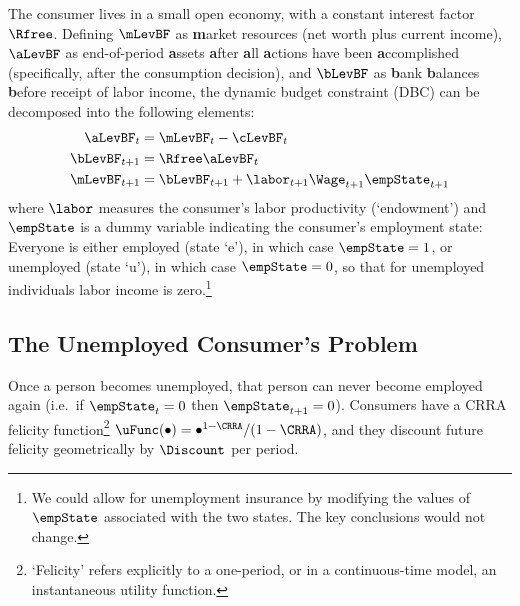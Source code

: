 \documentclass{handout}
\begin{document}
The consumer lives in a small open economy, with a constant interest factor $\Rfree$.  Defining $\mLevBF$ as
{\bf m}arket resources (net worth plus current income), $\aLevBF$ as
end-of-period {\bf a}ssets {\bf a}fter {\bf a}ll {\bf a}ctions have been {\bf a}ccomplished
(specifically, after the consumption decision), and $\bLevBF$ as {\bf b}ank
{\bf b}alances {\bf b}efore receipt of labor income, the dynamic budget constraint (DBC) can be decomposed into the
following elements:
\begin{equation}\begin{gathered}\begin{aligned}
    \aLevBF_{t} & =  \mLevBF_{t}-\cLevBF_{t}
\\  \bLevBF_{t+1} & =  \Rfree \aLevBF_{t}
\\  \mLevBF_{t+1} & =  \bLevBF_{t+1}+\labor_{t+1}\Wage_{t+1}\empState_{t+1}  \label{eq:DBC}
\end{aligned}\end{gathered}\end{equation}
where $\labor$ measures the consumer's labor productivity
(`endowment') and $\empState$ is a dummy variable indicating the
consumer's employment state: Everyone is either
employed (state `e'), in which case $\empState = 1$, or unemployed
(state `u'), in which case $\empState=0$, so that for unemployed
individuals labor income is zero.\footnote{We could allow for
  unemployment insurance by modifying the values of $\empState$
  associated with the two states.  The key conclusions would not
  change.}

\pagebreak 
\subsection{The Unemployed Consumer's Problem} \label{subsec:Fred}

Once a person becomes unemployed, that person can never become
employed again (i.e.\ if $\empState_{t}=0$ then $\empState_{t+1}=0$).
Consumers have a CRRA felicity function\footnote{`Felicity' refers
  explicitly to a one-period, or in a continuous-time model, an
  instantaneous utility function.}
$\uFunc(\bullet)= \bullet^{1-\CRRA}/(1-\CRRA)$, and they discount
future felicity geometrically by $\Discount$ per period.
\end{document}
